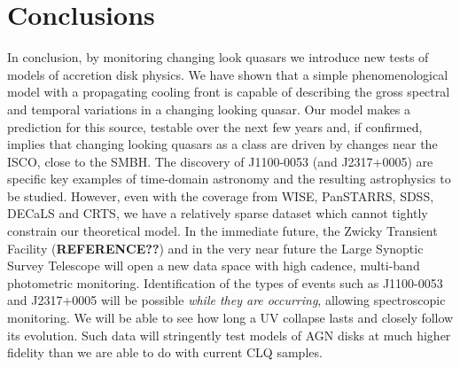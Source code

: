 \documentclass{nature}
\begin{document}
\section{Conclusions} 
In conclusion, by monitoring changing look quasars we introduce new
tests of models of accretion disk physics. We have shown that a simple
phenomenological model with a propagating cooling front is capable of
describing the gross spectral and temporal variations in a changing
looking quasar. Our model makes a prediction for this source, testable
over the next few years and, if confirmed, implies that changing
looking quasars as a class are driven by changes near the ISCO, close
to the SMBH. The discovery of J1100-0053 (and J2317+0005) are specific
key examples of time-domain astronomy and the resulting astrophysics
to be studied. However, even with the coverage from WISE, PanSTARRS,
SDSS, DECaLS and CRTS, we have a relatively sparse dataset which
cannot tightly constrain our theoretical model. In the immediate
future, the Zwicky Transient Facility ({\bf REFERENCE??})  and in the
very near future the Large Synoptic Survey Telescope
\citep{Ivezic2008, LSST_ScienceBookV2} will open a new data space with
high cadence, multi-band photometric monitoring.  Identification of
the types of events such as J1100-0053 and J2317+0005 will be possible
\emph{while they are occurring}, allowing spectroscopic monitoring.
We will be able to see how long a UV collapse lasts and closely follow
its evolution.  Such data will stringently test models of AGN disks at
much higher fidelity than we are able to do with current CLQ samples.



\end{document}
